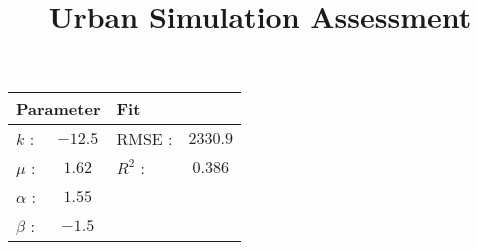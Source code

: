 \documentclass[11pt]{article} %
\title{\vspace{-3.0cm}Urban Simulation Assessment}
\begin{document}
\begin{center}
\begin{tabular}{lclc}
 \multicolumn{2}{l}{Parameter} 	& \multicolumn{2}{l}{Fit } \\ \hline	 
 $k$ : 		& $-12.5$ 	& RMSE :	&  $2330.9$	  	\\
 $\mu$ :	& $1.62$	& $R^2$ :	&  	$0.386$  	\\
 $\alpha$ :	& $1.55$	&  			&  	  			\\
 $\beta$ :	& $-1.5$	& 	 		&
\end{tabular}
\label{unconstrained}
\end{center} 



\begin{sidewaystable}
\tiny
{}
\end{sidewaystable}
\end{document}
